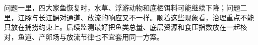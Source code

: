 问题一里，四大家鱼恢复时，水草、浮游动物和底栖饵料可能继续下降；问题二里，江豚与长江鲟对通道、放流的响应又不一样。顺着这些现象看，治理重点不能只放在捕捞约束上。后续监测最好把鱼类总量、底层资源和食压指数放在一起核对，鱼道、产卵场与放流节律也不宜套用同一方案。

